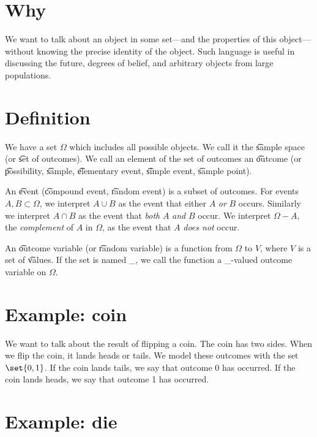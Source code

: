 

\section*{Why}

We want to talk about an object in some set---and the properties of this object---without knowing the precise identity of the object.
Such language is useful in discussing the future, degrees of belief, and arbitrary objects from large populations.

\section*{Definition}

We have a set $\Omega $ which includes all possible objects.
We call it the \t{sample space} (or \t{set of outcomes}).
We call an element of the set of outcomes an \t{outcome} (or \t{possibility}, \t{sample}, \t{elementary event}, \t{simple event}, \t{sample point}).

An \t{event} (\t{compound event}, \t{random event}) is a subset of outcomes.
For events $A, B \subset \Omega $, we interpret $A \cup B$ as the event that either $A$ \textit{or} $B$ occurs.
Similarly we interpret $A \cap  B$ as the event that \textit{both} $A$ \textit{and} $B$ occur.
We interpret $\Omega  - A$, the \textit{complement} of $A$ in $\Omega $, as the event that $A$ \textit{does not} occur.

An \t{outcome variable} (or \t{random variable}) is a function from $\Omega $ to $V$, where $V$ is a set of \t{values}.
If the set is named \_, we call the function a \_-valued outcome variable on $\Omega $.

\section*{Example: coin}

We want to talk about the result of flipping a coin.
The coin has two sides.
When we flip the coin, it lands heads or tails.
We model these outcomes with the set $\set{0, 1}$.
If the coin lands tails, we say that outcome 0 has occurred.
If the coin lands heads, we say that outcome 1 has occurred.

\section*{Example: die}

